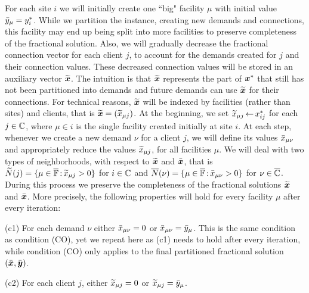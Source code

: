 \documentclass[11pt]{article}
\begin{document}
For each site $i$ we will initially create one ``big"
facility $\mu$ with initial value ${\bar y}_\mu = y^\ast_i$.
While we partition the instance, creating new demands and
connections, this facility may end up being split into more
facilities to preserve completeness of the fractional
solution. Also, we will gradually decrease the fractional
connection vector for each client $j$, to account for the
demands created for $j$ and their connection values.  These
decreased connection values will be stored in an auxiliary
vector $\widetilde{\boldsymbol{x}}$. The intuition is that $\widetilde{\boldsymbol{x}}$
represents the part of $\boldsymbol{x}^\ast$ that still has not been
partitioned into demands and future demands can use
$\widetilde{\boldsymbol{x}}$ for their connections. For technical reasons,
$\widetilde{\boldsymbol{x}}$ will be indexed by facilities (rather than
sites) and clients, that is $\widetilde{\boldsymbol{x}} = ({\widetilde x}_{\mu j})$.
At the beginning, we set ${\widetilde x}_{\mu j}{\,\leftarrow\,}
x_{ij}^\ast$ for each $j\in\mathbb{C}$, where $\mu\in i$ is
the single facility created initially at site $i$.  At each
step, whenever we create a new demand $\nu$ for a client
$j$, we will define its values ${\bar x}_{\mu\nu}$ and
appropriately reduce the values ${\widetilde x}_{\mu j}$, for all
facilities $\mu$. We will deal with two types of
neighborhoods, with respect to $\widetilde{\boldsymbol{x}}$ and $\bar{\boldsymbol{x}}$,
that is ${\widetilde N}(j)=\{\mu\in\overline{\mathbb{F}}
{\,:\,}{\widetilde x}_{\mu j} > 0\}$ for $i\in\mathbb{C}$ and
${\overline{N}}(\nu)=\{\mu\in\overline{\mathbb{F}} {\,:\,} {\bar x}_{\mu\nu}
>0\}$ for $\nu\in\overline{\mathbb{C}}$.  During this process we
preserve the completeness of the fractional solutions
$\widetilde{\boldsymbol{x}}$ and $\bar{\boldsymbol{x}}$. More precisely, the following
properties will hold for every facility $\mu$ after every
iteration:
%
\begin{description}
	
	\item{(c1)} For each demand $\nu$ either ${\bar x}_{\mu\nu}=0$ or
			${\bar x}_{\mu\nu}={\bar y}_{\mu}$. This is the same
      condition as condition (CO), yet we repeat here as
      (c1) needs to hold after every iteration, while
      condition (CO) only applies to the final partitioned
      fractional solution $(\bar{\boldsymbol{x}}, \bar{\boldsymbol{y}})$.

	\item{(c2)} For each client $j$,
			either ${\widetilde x}_{\mu j}=0$ or ${\widetilde x}_{\mu j}={\bar y}_{\mu}$.
			
\end{description}
\end{document}
